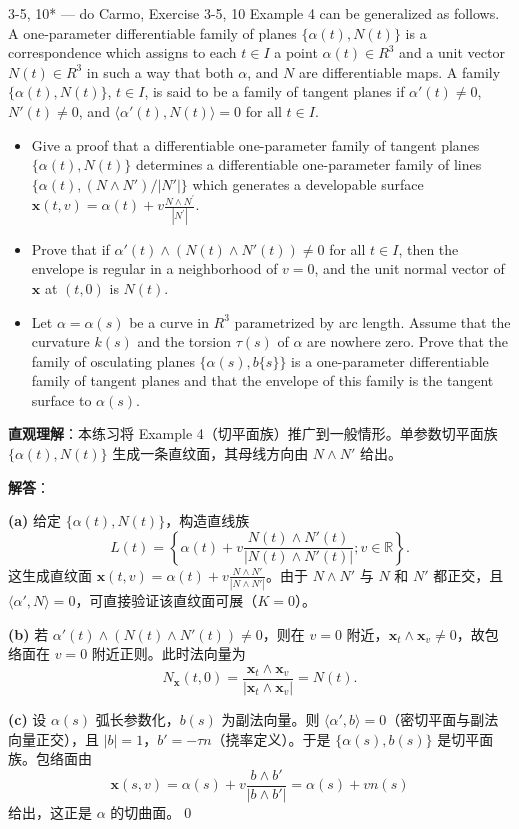 \begin{exercise}{3-5, 10* — do Carmo, Exercise 3-5, 10}
Example 4 can be generalized as follows. A one-parameter differentiable family of planes $\{\alpha(t), N(t)\}$ is a correspondence which assigns to each $t \in I$ a point $\alpha(t) \in R^3$ and a unit vector $N(t) \in R^3$ in such a way that both $\alpha$, and $N$ are differentiable maps. A family $\{\alpha(t), N(t)\}$, $t \in I$, is said to be a family of tangent planes if $\alpha'(t) \neq 0$, $N'(t) \neq 0$, and $\langle \alpha'(t), N(t) \rangle = 0$ for all $t \in I$.
\begin{itemize}
\item[a.] Give a proof that a differentiable one-parameter family of tangent planes $\{\alpha(t), N(t)\}$ determines a differentiable one-parameter family of lines $\{\alpha(t), (N \wedge N') / |N'|\}$ which generates a developable surface $\mathbf{x} (t, v) = \alpha (t) + v \frac {N \wedge N ^ {\prime}}{| N ^ {\prime} |}$.
\item[b.] Prove that if $\alpha'(t) \wedge (N(t) \wedge N'(t)) \neq 0$ for all $t \in I$, then the envelope is regular in a neighborhood of $v = 0$, and the unit normal vector of $\mathbf{x}$ at $(t, 0)$ is $N(t)$.
\item[c.] Let $\alpha = \alpha(s)$ be a curve in $R^3$ parametrized by arc length. Assume that the curvature $k(s)$ and the torsion $\tau(s)$ of $\alpha$ are nowhere zero. Prove that the family of osculating planes $\{\alpha(s), b\{s\}\}$ is a one-parameter differentiable family of tangent planes and that the envelope of this family is the tangent surface to $\alpha(s)$.
\end{itemize}
\end{exercise}
\begin{solution}
\textbf{直观理解}：本练习将 Example 4（切平面族）推广到一般情形。单参数切平面族 $\{\alpha(t), N(t)\}$ 生成一条直纹面，其母线方向由 $N\wedge N'$ 给出。

\textbf{解答}：

\textbf{(a)} 给定 $\{\alpha(t), N(t)\}$，构造直线族
\[
L(t) = \left\{\alpha(t) + v\frac{N(t)\wedge N'(t)}{|N(t)\wedge N'(t)|} ; v\in\mathbb{R}\right\}.
\]
这生成直纹面 $\mathbf{x}(t,v) = \alpha(t) + v\frac{N\wedge N'}{|N\wedge N'|}$。由于 $N\wedge N'$ 与 $N$ 和 $N'$ 都正交，且 $\langle\alpha', N\rangle = 0$，可直接验证该直纹面可展（$K=0$）。

\textbf{(b)} 若 $\alpha'(t)\wedge(N(t)\wedge N'(t)) \neq 0$，则在 $v=0$ 附近，$\mathbf{x}_t\wedge\mathbf{x}_v \neq 0$，故包络面在 $v=0$ 附近正则。此时法向量为
\[
N_{\mathbf{x}}(t,0) = \frac{\mathbf{x}_t\wedge\mathbf{x}_v}{|\mathbf{x}_t\wedge\mathbf{x}_v|} = N(t).
\]

\textbf{(c)} 设 $\alpha(s)$ 弧长参数化，$b(s)$ 为副法向量。则 $\langle\alpha', b\rangle = 0$（密切平面与副法向量正交），且 $|b|=1$，$b' = -\tau n$（挠率定义）。于是 $\{\alpha(s), b(s)\}$ 是切平面族。包络面由
\[
\mathbf{x}(s,v) = \alpha(s) + v\frac{b\wedge b'}{|b\wedge b'|} = \alpha(s) + v n(s)
\]
给出，这正是 $\alpha$ 的切曲面。\qed
\end{solution}

